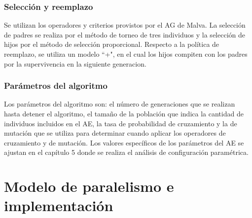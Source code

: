 \subsubsection{Selección y reemplazo}
Se utilizan los operadores y criterios provistos por el AG de Malva. La selección de padres se realiza por el método de torneo de tres individuos y la selección de hijos por el método de selección proporcional. Respecto a la política de reemplazo, se utiliza un modelo ``+", en el cual los hijos compiten con los padres por la supervivencia en la siguiente generacion.

\subsubsection{Parámetros del algoritmo}
Los parámetros del algoritmo son: el número de generaciones que se realizan hasta detener el algoritmo, el tamaño de la población que indica la cantidad de individuos incluidos en el AE, la tasa de probabilidad de cruzamiento y la de mutación que se utiliza para determinar cuando aplicar los operadores de cruzamiento y de mutación. Los valores específicos de los parámetros del AE se ajustan en el capítulo 5 donde se realiza el análisis de configuración paramétrica. 

\section{Modelo de paralelismo e implementación}





